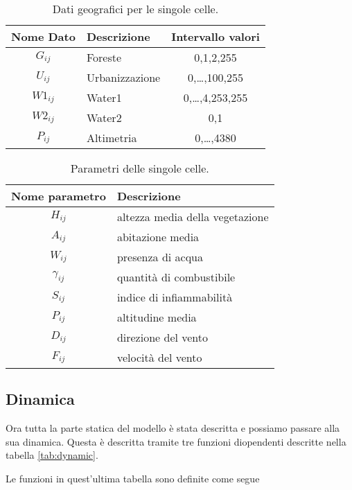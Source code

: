 \documentclass[draft]{article}
\begin{document}
\begin{table}
\centering
\begin{tabular}{|c|l|c|}
	\hline
	\textbf{Nome Dato} & \textbf{Descrizione} & \textbf{Intervallo valori}\\
	\hline
	$G_{ij}$ & Foreste & 0,1,2,255\\
	$U_{ij}$ & Urbanizzazione & 0,\ldots,100,255\\
	$W1_{ij}$ & Water1 & 0,\ldots,4,253,255\\
	$W2_{ij}$ & Water2 & 0,1\\
	$P_{ij}$ & Altimetria & 0,\ldots,4380\\
	\hline
\end{tabular}
\caption{Dati geografici per le singole celle.}
\label{tab:geo}
\end{table}

\begin{table}
\centering
\begin{tabular}{|c|l|}
	\hline
	\textbf{Nome parametro} & \textbf{Descrizione}\\
	\hline
	$H_{ij}$ & altezza media della vegetazione\\
	$A_{ij}$ & abitazione media\\
	$W_{ij}$ & presenza di acqua\\
	$\gamma_{ij}$ & quantità di combustibile\\ %
	$S_{ij}$ & indice di infiammabilità\\
	$P_{ij}$ & altitudine media\\
	$D_{ij}$ & direzione del vento\\
	$F_{ij}$ & velocità del vento\\
	\hline
\end{tabular}
\caption{Parametri delle singole celle.}
\label{tab:params}
\end{table}

\subsection{Dinamica}

Ora tutta la parte statica del modello è stata descritta e possiamo passare alla
sua dinamica. Questa è descritta tramite tre funzioni diopendenti descritte
nella tabella \ref{tab:dynamic}.

Le funzioni in quest'ultima tabella sono definite come segue
\end{document}
